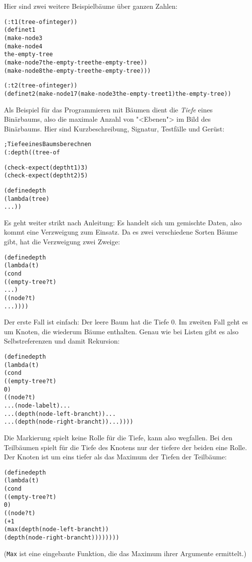 %
Hier sind zwei weitere Beispielbäume über ganzen Zahlen:
\begin{alltt}
(: t1 (tree-of integer))
(define t1
  (make-node 3
    (make-node 4
      the-empty-tree
      (make-node 7 the-empty-tree the-empty-tree))
    (make-node 8 the-empty-tree the-empty-tree)))

(: t2 (tree-of integer))
(define t2 (make-node 17 (make-node 3 the-empty-tree t1) the-empty-tree))
\end{alltt}
Als Beispiel für das Programmieren mit Bäumen dient die
\textit{Tiefe}
eines Binärbaums, also die maximale Anzahl von "<Ebenen"> im Bild des
Binärbaums.  Hier sind Kurzbeschreibung, Signatur, Testfälle und
Gerüst:
%
\begin{alltt}
; Tiefe eines Baums berechnen
(: depth ((tree-of %a) -> natural))

(check-expect (depth t1) 3)
(check-expect (depth t2) 5)

(define depth
  (lambda (tree)
    ...))
\end{alltt}
%
Es geht weiter strikt nach Anleitung: Es handelt sich um gemischte
Daten, also kommt eine Verzweigung zum Einsatz.  Da es zwei
verschiedene Sorten Bäume gibt, hat die Verzweigung zwei Zweige:
%
\begin{alltt}
(define depth
  (lambda (t)
    (cond
      ((empty-tree? t)
       ...)
      ((node? t)
       ...))))
\end{alltt}
%
Der erste Fall ist einfach: Der leere Baum hat die Tiefe 0.  Im
zweiten Fall geht es um Knoten, die wiederum Bäume enthalten.  Genau
wie bei Listen gibt es also Selbstreferenzen und damit Rekursion:
%
\begin{alltt}
(define depth
  (lambda (t)
    (cond
      ((empty-tree? t)
       0)
      ((node? t)
       ... (node-label t) ...
       ... (depth (node-left-branch t)) ...
       ... (depth (node-right-branch t)) ...))))
\end{alltt}
%
Die Markierung spielt keine Rolle für die Tiefe, kann also wegfallen.
Bei den Teilbäumen spielt für die Tiefe des Knotens nur der tiefere
der beiden eine Rolle.  Der Knoten ist um eins tiefer als das Maximum
der Tiefen der Teilbäume:
%
\begin{alltt}
(define depth
  (lambda (t)
    (cond
      ((empty-tree? t)
       0)
      ((node? t)
       (+ 1
          (max (depth (node-left-branch t))
               (depth (node-right-branch t))))))))
\end{alltt}
%
(\texttt{Max} ist eine eingebaute Funktion,
die das Maximum ihrer Argumente ermittelt.)

